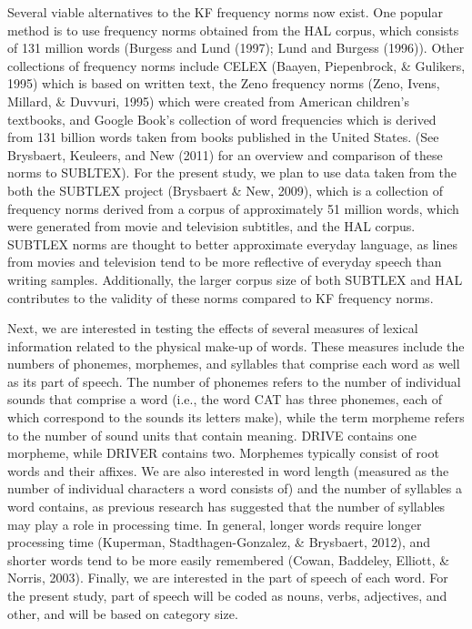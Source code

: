 \documentclass[english,man]{apa6}
\theoremstyle{definition}
\theoremstyle{definition}
\theoremstyle{remark}
\begin{document}
Several viable alternatives to the KF frequency norms now exist. One
popular method is to use frequency norms obtained from the HAL corpus,
which consists of 131 million words (Burgess and Lund (1997); Lund and
Burgess (1996)). Other collections of frequency norms include CELEX
(Baayen, Piepenbrock, \& Gulikers, 1995) which is based on written text,
the Zeno frequency norms (Zeno, Ivens, Millard, \& Duvvuri, 1995) which
were created from American children's textbooks, and Google Book's
collection of word frequencies which is derived from 131 billion words
taken from books published in the United States. (See Brysbaert,
Keuleers, and New (2011) for an overview and comparison of these norms
to SUBLTEX). For the present study, we plan to use data taken from the
both the SUBTLEX project (Brysbaert \& New, 2009), which is a collection
of frequency norms derived from a corpus of approximately 51 million
words, which were generated from movie and television subtitles, and the
HAL corpus. SUBTLEX norms are thought to better approximate everyday
language, as lines from movies and television tend to be more reflective
of everyday speech than writing samples. Additionally, the larger corpus
size of both SUBTLEX and HAL contributes to the validity of these norms
compared to KF frequency norms.

Next, we are interested in testing the effects of several measures of
lexical information related to the physical make-up of words. These
measures include the numbers of phonemes, morphemes, and syllables that
comprise each word as well as its part of speech. The number of phonemes
refers to the number of individual sounds that comprise a word (i.e.,
the word CAT has three phonemes, each of which correspond to the sounds
its letters make), while the term morpheme refers to the number of sound
units that contain meaning. DRIVE contains one morpheme, while DRIVER
contains two. Morphemes typically consist of root words and their
affixes. We are also interested in word length (measured as the number
of individual characters a word consists of) and the number of syllables
a word contains, as previous research has suggested that the number of
syllables may play a role in processing time. In general, longer words
require longer processing time (Kuperman, Stadthagen-Gonzalez, \&
Brysbaert, 2012), and shorter words tend to be more easily remembered
(Cowan, Baddeley, Elliott, \& Norris, 2003). Finally, we are interested
in the part of speech of each word. For the present study, part of
speech will be coded as nouns, verbs, adjectives, and other, and will be
based on category size.
\end{document}
